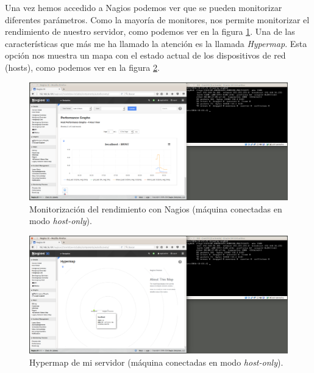 \documentclass[a4paper,titlepage,12pt]{scrartcl}	%
\numberwithin{figure}{section} %
\numberwithin{table}{section} %
\begin{document}
	Una vez hemos accedido a Nagios podemos ver que se pueden monitorizar diferentes parámetros. Como la mayoría de monitores, nos permite monitorizar el rendimiento de nuestro servidor, como podemos ver en la figura \ref{O2-rendimiento}. Una de las características que más me ha llamado la atención es la llamada \textit{Hypermap}. Esta opción nos muestra un mapa con el estado actual de los dispositivos de red (hosts), como podemos ver en la figura \ref{O2-hypermap}.
	
	\begin{figure}[H]
		\includegraphics[width=\linewidth]{./Imagenes/O2-rendimiento.png}
		\vspace{-0.5cm}
		\caption[Monitorización del rendimiento con Nagios (máquina conectadas en modo \textit{host-only}).]{Monitorización del rendimiento con Nagios (máquina conectadas en modo \textit{host-only}).}
		\label{O2-rendimiento}
	\end{figure}
	
	\begin{figure}[H]
		\includegraphics[width=\linewidth]{./Imagenes/O2-hypermap.png}
		\vspace{-0.5cm}
		\caption[Hypermap de mi servidor (máquina conectadas en modo \textit{host-only}).]{Hypermap de mi servidor  (máquina conectadas en modo \textit{host-only}).}
		\label{O2-hypermap}
	\end{figure}
	
\end{document}
